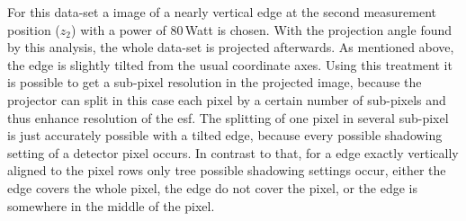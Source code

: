 For this data-set a image of a nearly vertical edge at the second measurement position ($z_{2}$) with a power of $80\,$Watt is chosen. With the projection angle found by this analysis, the whole data-set is projected afterwards. As mentioned above, the edge is slightly tilted from the usual coordinate axes. Using this treatment it is possible to get a sub-pixel resolution in the projected image, because the projector can split in this case each pixel by a certain number of sub-pixels and thus enhance resolution of the \gls{esf}. The splitting of one pixel in several sub-pixel is just accurately possible with a tilted edge, because every possible shadowing setting of a detector pixel occurs. In contrast to that, for a edge exactly vertically aligned to the pixel rows only tree possible shadowing settings occur, either the edge covers the whole pixel, the edge do not cover the pixel, or the edge is somewhere in the middle of the pixel.\\

